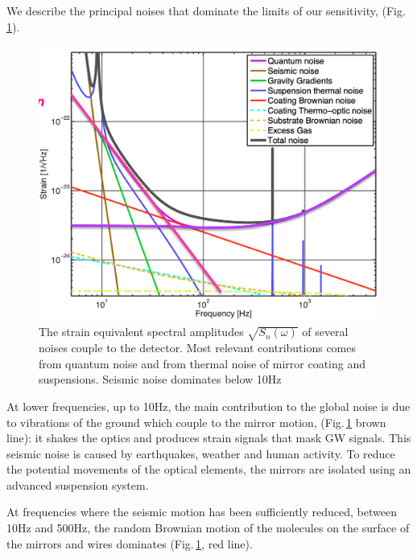 \documentclass[binding=0.6cm, LaM]{sapthesis}
\begin{document}
        We describe the principal noises that dominate the limits of our sensitivity, (Fig.\,\ref{fig:noise2}).
        \begin{figure}[t]
          \includegraphics[scale=0.3]{noise2}
          \centering
          \caption{The strain equivalent spectral amplitudes $\sqrt{S_n(\omega)}$ of several noises couple to the detector. Most relevant contributions comes from quantum noise and from thermal noise of mirror coating and suspensions. Seismic noise dominates below 10Hz}
          \label{fig:noise2}
        \end{figure}
        At lower frequencies, up to 10Hz, the main contribution to the global noise
        is due to vibrations of the ground which couple to the mirror motion, (Fig.\,\ref{fig:noise2} brown line): 
	it shakes the optics and produces strain signals that mask GW signals. 
        This seismic noise is caused by earthquakes, weather and human activity.
        To reduce the potential movements of the optical elements,
        the mirrors are isolated using an advanced suspension system.

        At frequencies where the seismic motion has been sufficiently reduced,
        between 10Hz and 500Hz, the random Brownian motion of the molecules on the surface of the mirrors and wires dominates (Fig.\,\ref{fig:noise2}, red line).
\end{document}
